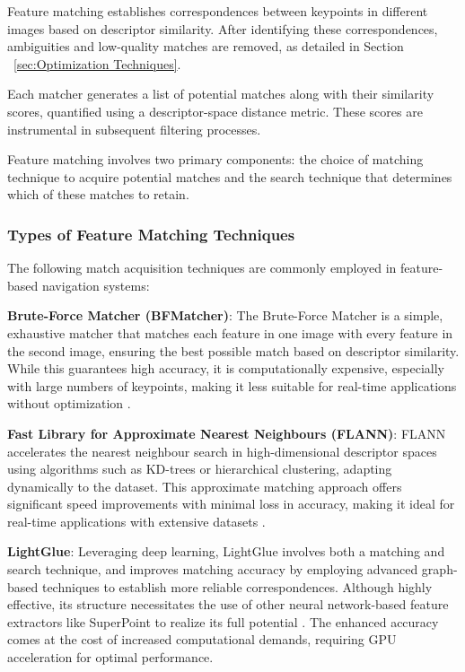 Feature matching establishes correspondences between keypoints in different images based on descriptor similarity. After identifying these correspondences, ambiguities and low-quality matches are removed, as detailed in Section ~\ref{sec:Optimization Techniques}. 

Each matcher generates a list of potential matches along with their similarity scores, quantified using a descriptor-space distance metric. These scores are instrumental in subsequent filtering processes.

Feature matching involves two primary components: the choice of matching technique to acquire potential matches and the search technique that determines which of these matches to retain. 

\subsubsection{Types of Feature Matching Techniques}

The following match acquisition techniques are commonly employed in feature-based navigation systems:

\textbf{Brute-Force Matcher (BFMatcher)}: The Brute-Force Matcher is a simple, exhaustive matcher that matches each feature in one image with every feature in the second image, ensuring the best possible match based on descriptor similarity. While this guarantees high accuracy, it is computationally expensive, especially with large numbers of keypoints, making it less suitable for real-time applications without optimization \cite{opencv_bfmatcher}.

\textbf{Fast Library for Approximate Nearest Neighbours (FLANN)}: FLANN accelerates the nearest neighbour search in high-dimensional descriptor spaces using algorithms such as KD-trees or hierarchical clustering, adapting dynamically to the dataset. This approximate matching approach offers significant speed improvements with minimal loss in accuracy, making it ideal for real-time applications with extensive datasets \cite{muja2014scalable}.

\textbf{LightGlue}: Leveraging deep learning, LightGlue involves both a matching and search technique, and improves matching accuracy by employing advanced graph-based techniques to establish more reliable correspondences. Although highly effective, its structure necessitates the use of other neural network-based feature extractors like SuperPoint to realize its full potential \cite{cvg2023lightglue}. The enhanced accuracy comes at the cost of increased computational demands, requiring GPU acceleration for optimal performance.

